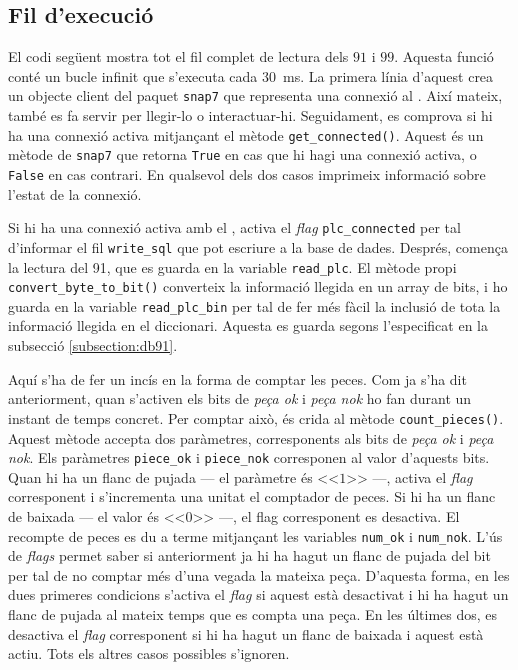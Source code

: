 \documentclass{tfgitic}[2022/06/30]
\begin{document}
\subsection{Fil d'execució}
El codi següent mostra tot el fil complet de lectura dels  $91$ i $99$. Aquesta funció conté un bucle infinit que s'executa cada \SI{30}{ms}. La primera línia d'aquest crea un objecte client del paquet \texttt{snap7} que representa una connexió al . Així mateix, també es fa servir per llegir-lo o interactuar-hi. Seguidament, es comprova si hi ha una connexió activa mitjançant el mètode \texttt{get\_connected()}. Aquest és un mètode de \texttt{snap7} que retorna \texttt{True} en cas que hi hagi una connexió activa, o \texttt{False} en cas contrari. En qualsevol dels dos casos imprimeix informació sobre l'estat de la connexió.

Si hi ha una connexió activa amb el , activa el \emph{flag} \texttt{plc\_connected} per tal d'informar el fil \texttt{write\_sql} que pot escriure a la base de dades. Després, comença la lectura del  91, que es guarda en la variable \texttt{read\_plc}. El mètode propi \texttt{convert\_byte\_to\_bit()} converteix la informació llegida en un array de bits, i ho guarda en la variable \texttt{read\_plc\_bin} per tal de fer més fàcil la inclusió de tota la informació llegida en el diccionari. Aquesta es guarda segons l'especificat en la subsecció \ref{subsection:db91}.

Aquí s'ha de fer un incís en la forma de comptar les peces. Com ja s'ha dit anteriorment, quan s'activen els bits de \emph{peça ok} i \emph{peça nok} ho fan durant un instant de temps concret. Per comptar això, és crida al mètode \texttt{count\_pieces()}. Aquest mètode accepta dos paràmetres, corresponents als bits de \emph{peça ok} i \emph{peça nok}. Els paràmetres \texttt{piece\_ok} i \texttt{piece\_nok} corresponen al valor d'aquests bits. Quan hi ha un flanc de pujada --- el paràmetre és <<$1$>> ---, activa el \emph{flag} corresponent i s'incrementa una unitat el comptador de peces. Si hi ha un flanc de baixada --- el valor és <<$0$>> ---, el flag corresponent es desactiva.  El recompte de peces es du a terme mitjançant les variables \texttt{num\_ok} i \texttt{num\_nok}. L'ús de \emph{flags} permet saber si anteriorment ja hi ha hagut un flanc de pujada del bit per tal de no comptar més d'una vegada la mateixa peça. D'aquesta forma, en les dues primeres condicions s'activa el \emph{flag} si aquest està desactivat i hi ha hagut un flanc de pujada al mateix temps que es compta una peça. En les últimes dos, es desactiva el \emph{flag} corresponent si hi ha hagut un flanc de baixada i aquest està actiu. Tots els altres casos possibles s'ignoren.
\end{document}
